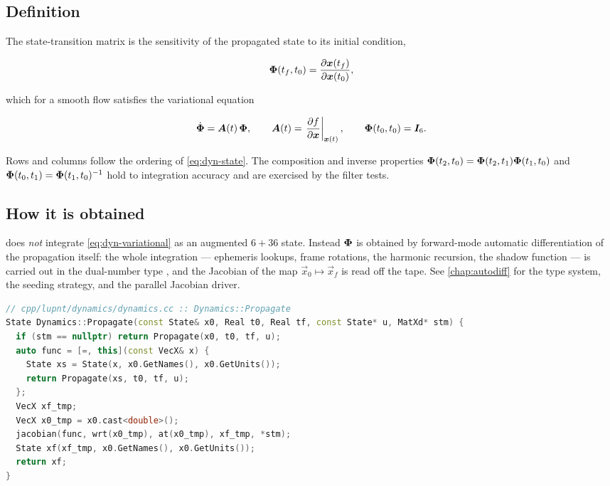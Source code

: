 \subsection{Definition}

The state-transition matrix is the sensitivity of the propagated state to its
initial condition,

\begin{equation}
  \label{eq:dyn-stm}
  \bm{\Phi}(t_f,t_0) = \frac{\partial\bm{x}(t_f)}{\partial\bm{x}(t_0)},
\end{equation}

which for a smooth flow satisfies the variational equation

\begin{equation}
  \label{eq:dyn-variational}
  \dot{\bm{\Phi}} = \bm{A}(t)\,\bm{\Phi},
  \qquad
  \bm{A}(t) = \left.\frac{\partial f}{\partial\bm{x}}\right|_{\bm{x}(t)},
  \qquad
  \bm{\Phi}(t_0,t_0) = \bm{I}_{6} .
\end{equation}

Rows and columns follow the ordering of \cref{eq:dyn-state}. The composition and
inverse properties $\bm{\Phi}(t_2,t_0)=\bm{\Phi}(t_2,t_1)\bm{\Phi}(t_1,t_0)$
and $\bm{\Phi}(t_0,t_1)=\bm{\Phi}(t_1,t_0)^{-1}$ hold to integration accuracy
and are exercised by the filter tests.

\subsection{How it is obtained}

\lupnt{} does \emph{not} integrate \cref{eq:dyn-variational} as an augmented
$6+36$ state. Instead $\bm{\Phi}$ is obtained by forward-mode automatic
differentiation of the propagation itself: the whole integration --- ephemeris
lookups, frame rotations, the harmonic recursion, the shadow function --- is
carried out in the dual-number type , and the Jacobian of the map
$\vec{x}_0\mapsto\vec{x}_f$ is read off the tape. See \cref{chap:autodiff} for
the type system, the seeding strategy, and the parallel Jacobian driver.

\begin{lstlisting}[language=cpp, caption={The generic autodiff STM.}, label={lst:dyn-stm}]
// cpp/lupnt/dynamics/dynamics.cc :: Dynamics::Propagate
State Dynamics::Propagate(const State& x0, Real t0, Real tf, const State* u, MatXd* stm) {
  if (stm == nullptr) return Propagate(x0, t0, tf, u);
  auto func = [=, this](const VecX& x) {
    State xs = State(x, x0.GetNames(), x0.GetUnits());
    return Propagate(xs, t0, tf, u);
  };
  VecX xf_tmp;
  VecX x0_tmp = x0.cast<double>();
  jacobian(func, wrt(x0_tmp), at(x0_tmp), xf_tmp, *stm);
  State xf(xf_tmp, x0.GetNames(), x0.GetUnits());
  return xf;
}
\end{lstlisting}

